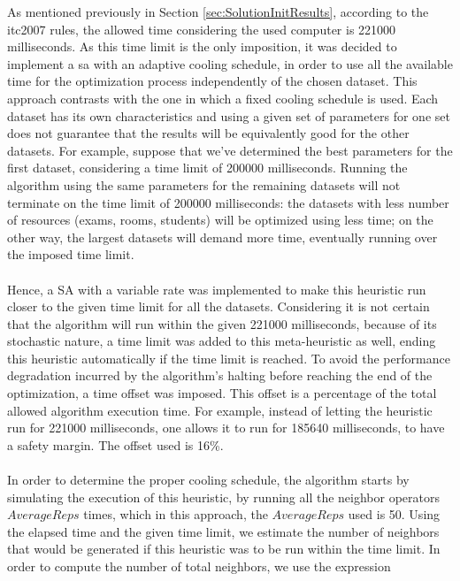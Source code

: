 As mentioned previously in Section \ref{sec:SolutionInitResults}, according to the \gls{itc2007} rules, the allowed time considering the used computer is 221000 milliseconds. As this time limit is the only imposition, it was decided to implement a \gls{sa} with an adaptive cooling schedule, in order to use all the available time for the optimization process independently of the chosen dataset. This approach contrasts with the one in which a fixed cooling schedule is used. Each dataset has its own characteristics and using a given set of parameters for one set does not guarantee that the results will be equivalently good for the other datasets. For example, suppose that we've determined the best parameters for the first dataset, considering a time limit of 200000 milliseconds. Running the algorithm using the same parameters for the remaining datasets will not terminate on the time limit of 200000 milliseconds: the datasets with less number of resources (exams, rooms, students) will be optimized using less time; on the other way, the largest datasets will demand more time, eventually running over the imposed time limit.\\
\\
Hence, a SA with a variable rate was implemented to make this heuristic run closer to the given time limit for all the datasets. Considering it is not certain that the algorithm will run within the given 221000 milliseconds, because of its stochastic nature, a time limit was added to this meta-heuristic as well, ending this heuristic automatically if the time limit is reached. To avoid the performance degradation incurred by the algorithm's halting before reaching the end of the optimization, a time offset was imposed. This offset is a percentage of the total allowed algorithm execution time. For example, instead of letting the heuristic run for 221000 milliseconds, one allows it to run for 185640 milliseconds, to have a safety margin. The offset used is 16\%.\\
\\
In order to determine the proper cooling schedule, the algorithm starts by simulating the execution of this heuristic, by running all the neighbor operators $AverageReps$ times, which in this approach, the $AverageReps$ used is 50. Using the elapsed time and the given time limit, we estimate the number of neighbors that would be generated if this heuristic was to be run within the time limit. In order to compute the number of total neighbors, we use the expression 
